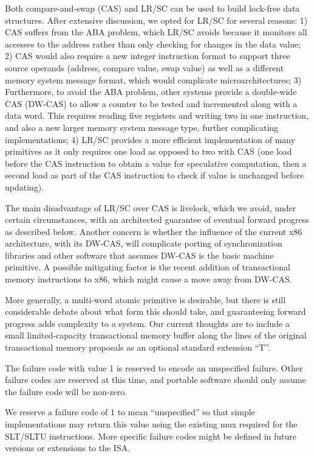 \begin{commentary}
Both compare-and-swap (CAS) and LR/SC can be used to build lock-free
data structures.  After extensive discussion, we opted for LR/SC for
several reasons: 1) CAS suffers from the ABA problem, which LR/SC
avoids because it monitors all accesses to the address rather than
only checking for changes in the data value; 2) CAS would also require
a new integer instruction format to support three source operands
(address, compare value, swap value) as well as a different memory
system message format, which would complicate microarchitectures; 3)
Furthermore, to avoid the ABA problem, other systems provide a
double-wide CAS (DW-CAS) to allow a counter to be tested and
incremented along with a data word. This requires reading five
registers and writing two in one instruction, and also a new larger
memory system message type, further complicating implementations; 4)
LR/SC provides a more efficient implementation of many primitives as
it only requires one load as opposed to two with CAS (one load before
the CAS instruction to obtain a value for speculative computation,
then a second load as part of the CAS instruction to check if value is
unchanged before updating).

The main disadvantage of LR/SC over CAS is livelock, which we avoid,
under certain circumstances,
with an architected guarantee of eventual forward progress as
described below.  Another concern is whether the influence of the
current x86 architecture, with its DW-CAS, will complicate porting of
synchronization libraries and other software that assumes DW-CAS is
the basic machine primitive.  A possible mitigating factor is the
recent addition of transactional memory instructions to x86, which
might cause a move away from DW-CAS.

More generally, a multi-word atomic primitive is desirable, but there is
still considerable debate about what form this should take, and
guaranteeing forward progress adds complexity to a system.  Our
current thoughts are to include a small limited-capacity transactional
memory buffer along the lines of the original transactional memory
proposals as an optional standard extension ``T''.
\end{commentary}

The failure code with value 1 is reserved to encode an unspecified
failure.  Other failure codes are reserved at this time, and portable
software should only assume the failure code will be non-zero.

\begin{commentary}
We reserve a failure code of 1 to mean ``unspecified'' so that simple
implementations may return this value using the existing mux required
for the SLT/SLTU instructions.  More specific failure codes might be
defined in future versions or extensions to the ISA.
\end{commentary}

